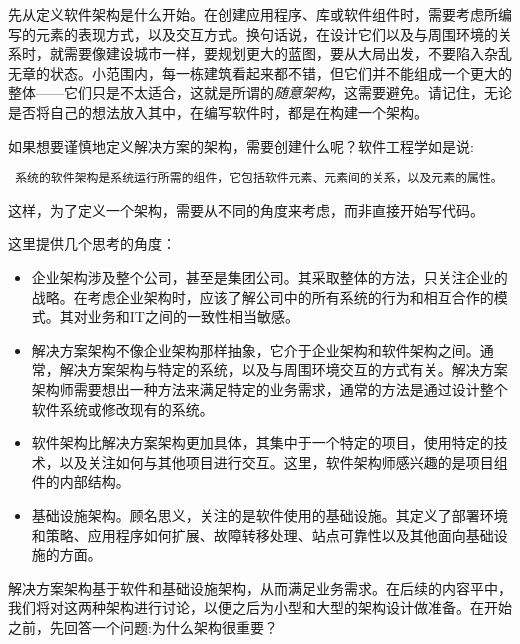 先从定义软件架构是什么开始。在创建应用程序、库或软件组件时，需要考虑所编写的元素的表现方式，以及交互方式。换句话说，在设计它们以及与周围环境的关系时，就需要像建设城市一样，要规划更大的蓝图，要从大局出发，不要陷入杂乱无章的状态。小范围内，每一栋建筑看起来都不错，但它们并不能组成一个更大的整体——它们只是不太适合，这就是所谓的\textit{随意架构}，这需要避免。请记住，无论是否将自己的想法放入其中，在编写软件时，都是在构建一个架构。

如果想要谨慎地定义解决方案的架构，需要创建什么呢？软件工程学如是说:

\begin{center}
\tt
系统的软件架构是系统运行所需的组件，它包括软件元素、元素间的关系，以及元素的属性。
\end{center}

这样，为了定义一个架构，需要从不同的角度来考虑，而非直接开始写代码。


这里提供几个思考的角度：

\begin{itemize}
\item 
企业架构涉及整个公司，甚至是集团公司。其采取整体的方法，只关注企业的战略。在考虑企业架构时，应该了解公司中的所有系统的行为和相互合作的模式。其对业务和IT之间的一致性相当敏感。

\item 
解决方案架构不像企业架构那样抽象，它介于企业架构和软件架构之间。通常，解决方案架构与特定的系统，以及与周围环境交互的方式有关。解决方案架构师需要想出一种方法来满足特定的业务需求，通常的方法是通过设计整个软件系统或修改现有的系统。

\item
软件架构比解决方案架构更加具体，其集中于一个特定的项目，使用特定的技术，以及关注如何与其他项目进行交互。这里，软件架构师感兴趣的是项目组件的内部结构。

\item
基础设施架构。顾名思义，关注的是软件使用的基础设施。其定义了部署环境和策略、应用程序如何扩展、故障转移处理、站点可靠性以及其他面向基础设施的方面。

\end{itemize}

解决方案架构基于软件和基础设施架构，从而满足业务需求。在后续的内容平中，我们将对这两种架构进行讨论，以便之后为小型和大型的架构设计做准备。在开始之前，先回答一个问题:为什么架构很重要？













